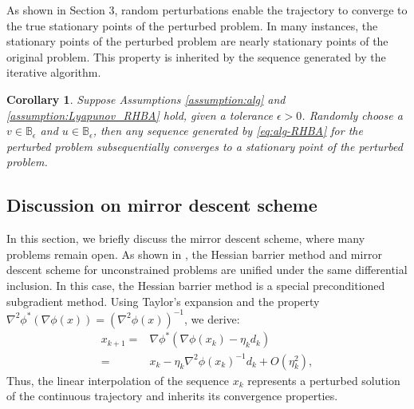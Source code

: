 \documentclass[11pt]{article}
\newtheorem{corollary}{Corollary}[section]
\begin{document}
As shown in Section 3, random perturbations enable the trajectory to converge to the true stationary points of the perturbed problem. In many instances, the stationary points of the perturbed problem are nearly stationary points of the original problem. This property is inherited by the sequence generated by the iterative algorithm.

\begin{corollary}
    Suppose Assumptions \ref{assumption:alg} and \ref{assumption:Lyapunov_RHBA} hold, given a tolerance $\epsilon>0$. Randomly choose a $v\in\mathbb{B}_\epsilon$ and $u\in\mathbb{B}_\epsilon$, then any sequence generated by \eqref{eq:alg-RHBA} for the perturbed problem subsequentially converges to a stationary point of the perturbed problem.
\end{corollary}


\subsection{Discussion on mirror descent scheme}
In this section, we briefly discuss the mirror descent scheme, where many problems remain open. As shown in \cite{ding2024stochastic}, the Hessian barrier method and mirror descent scheme for unconstrained problems are unified under the same differential inclusion. In this case, the Hessian barrier method is a special preconditioned subgradient method. Using Taylor's expansion and the property $\nabla^2\phi^*(\nabla\phi(x)) = (\nabla^2\phi(x))^{-1}$, we derive:
\[
\begin{aligned}
x_{k+1}=&\nabla\phi^*(\nabla\phi(x_k)-\eta_kd_k)\\
=&x_k-\eta_k\nabla^2\phi(x_k)^{-1}d_k+O(\eta_k^2),
\end{aligned}
\]
Thus, the linear interpolation of the sequence ${x_k}$ represents a perturbed solution of the continuous trajectory and inherits its convergence properties.
\end{document}
